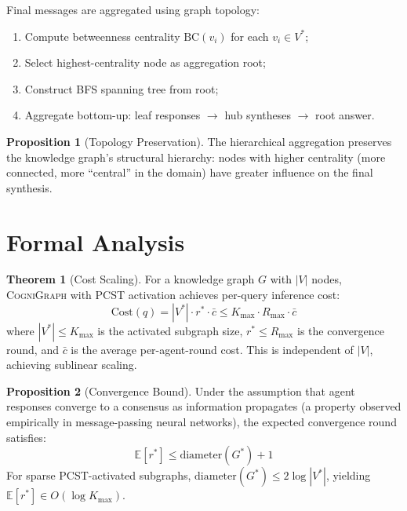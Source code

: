 \documentclass[a4paper,11pt]{article}
\theoremstyle{definition}
\newtheorem{proposition}{Proposition}[section]
\newtheorem{theorem}{Theorem}[section]
\newcommand{\cogni}{\textsc{CogniGraph}}
\begin{document}
Final messages are aggregated using graph topology:

\begin{enumerate}
\item Compute betweenness centrality $\mathrm{BC}(v_i)$ for each $v_i \in V^*$;
\item Select highest-centrality node as aggregation root;
\item Construct BFS spanning tree from root;
\item Aggregate bottom-up: leaf responses $\to$ hub syntheses $\to$ root answer.
\end{enumerate}

\begin{proposition}[Topology Preservation]
The hierarchical aggregation preserves the knowledge graph's structural hierarchy: nodes with higher centrality (more connected, more ``central'' in the domain) have greater influence on the final synthesis.
\end{proposition}

\section{Formal Analysis}
\label{sec:formal}

\begin{theorem}[Cost Scaling]
\label{thm:cost}
For a knowledge graph $G$ with $|V|$ nodes, \cogni{} with PCST activation achieves per-query inference cost:
\[
\mathrm{Cost}(q) = |V^*| \cdot r^* \cdot \bar{c} \leq K_{\max} \cdot R_{\max} \cdot \bar{c}
\]
where $|V^*| \leq K_{\max}$ is the activated subgraph size, $r^* \leq R_{\max}$ is the convergence round, and $\bar{c}$ is the average per-agent-round cost.
This is independent of $|V|$, achieving sublinear scaling.
\end{theorem}

\begin{proposition}[Convergence Bound]
\label{prop:convergence}
Under the assumption that agent responses converge to a consensus as information propagates (a property observed empirically in message-passing neural networks), the expected convergence round satisfies:
\[
\mathbb{E}[r^*] \leq \mathrm{diameter}(G^*) + 1
\]
For sparse PCST-activated subgraphs, $\mathrm{diameter}(G^*) \leq 2\log|V^*|$, yielding $\mathbb{E}[r^*] \in O(\log K_{\max})$.
\end{proposition}
\end{document}
